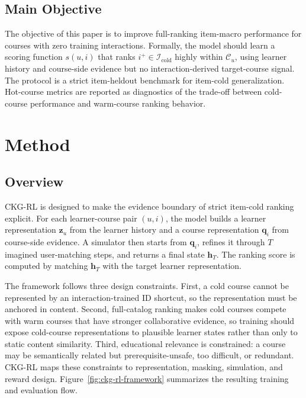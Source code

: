 \documentclass[sigconf,anonymous,review]{acmart}
\begin{document}
\subsection{Main Objective}
The objective of this paper is to improve full-ranking item-macro performance for courses with zero training interactions. Formally, the model should learn a scoring function \(s(u,i)\) that ranks \(i^+\in\mathcal{I}_{\mathrm{cold}}\) highly within \(\mathcal{C}_u\), using learner history and course-side evidence but no interaction-derived target-course signal. The protocol is a strict item-heldout benchmark for item-cold generalization. Hot-course metrics are reported as diagnostics of the trade-off between cold-course performance and warm-course ranking behavior.

\section{Method}
\subsection{Overview}
CKG-RL is designed to make the evidence boundary of strict item-cold ranking explicit. For each learner-course pair \((u,i)\), the model builds a learner representation \(\mathbf{z}_u\) from the learner history and a course representation \(\mathbf{q}_i\) from course-side evidence. A simulator then starts from \(\mathbf{q}_i\), refines it through \(T\) imagined user-matching steps, and returns a final state \(\mathbf{h}_T\). The ranking score is computed by matching \(\mathbf{h}_T\) with the target learner representation.

The framework follows three design constraints. First, a cold course cannot be represented by an interaction-trained ID shortcut, so the representation must be anchored in content. Second, full-catalog ranking makes cold courses compete with warm courses that have stronger collaborative evidence, so training should expose cold-course representations to plausible learner states rather than only to static content similarity. Third, educational relevance is constrained: a course may be semantically related but prerequisite-unsafe, too difficult, or redundant. CKG-RL maps these constraints to representation, masking, simulation, and reward design. Figure~\ref{fig:ckg-rl-framework} summarizes the resulting training and evaluation flow.
\end{document}
